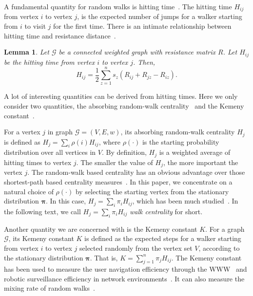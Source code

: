 \documentclass[sigconf]{acmart}
\newtheorem{lemma}[theorem]{Lemma}
\def\calG{\mathcal{G}}
\newcommand\ppi{\boldsymbol{\pi}}
\newcommand\RR{\boldsymbol{\mathit{R}}}
\begin{document}
A fundamental quantity for random walks is hitting time~\cite{Lo93,CoBeTeVoKl07}. The hitting time $H_{ij}$ from vertex $i$ to vertex $j$,  is the expected number of jumps for a walker starting  from $i$ to visit $j$ for the first time. There is an intimate relationship between hitting time and resistance distance~\cite{Te91}.
\begin{lemma}
	Let $\calG$ be a connected weighted graph with  resistance matrix  $\RR$. Let $H_{ij}$ be the hitting time  from vertex $i$ to vertex $j$. Then,
	\begin{equation}\label{EE03}
		H_{ij}=\frac{1}{2}\sum_{z=1}^{n} s_z(R_{ij}+R_{jz}-R_{iz}).
	\end{equation}
\end{lemma}

A lot of  interesting quantities can be derived from hitting times. Here we only consider two quantities, the absorbing random-walk centrality~\cite{MaMagi15}  and the Kemeny constant~\cite{Hu14}.

For a vertex $j$ in graph $\calG=(V,E,w)$, its absorbing random-walk centrality $H_j$ is defined as $H_j=\sum_{i} \rho(i) H_{ij}$, where $\rho(\cdot)$ is the starting probability distribution over all vertices in $V$. By definition, $H_j$ is a weighted average of hitting times to vertex $j$. The smaller the value of $H_j$, the more important the vertex $j$. The random-walk based centrality has an obvious advantage over those shortest-path based centrality measures~\cite{Ne05}. In this paper, we concentrate on a natural choice of  $\rho(\cdot)$ by selecting the starting vertex from the stationary distribution $\ppi$. In this case, $H_j=\sum_{i} \pi_i H_{ij}$, which has been much studied~\cite{TeBeVo09,Be09,Be16}. In the following text, we  call $H_j=\sum_{i} \pi_i H_{ij}$ \textit{walk centrality} for short.

Another quantity we are concerned with is the Kemeny constant $K$. For a graph $\calG$, its Kemeny constant $K$ is defined as the expected steps for a walker starting from  vertex $i$ to vertex $j$ selected randomly from the vertex set $V$, according to the stationary distribution $\ppi$. That is, $K = \sum_{j = 1}^{n} \pi_j H_{ij}$. The Kemeny constant has been used to measure the user navigation efficiency through the WWW~\cite{LeLo02} and  robotic surveillance efficiency in network environments~\cite{PaAgBu15}. It can also measure the mixing rate of random walks~\cite{LePeWi09}.
\end{document}

